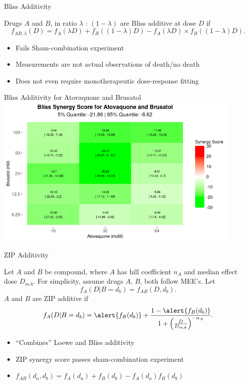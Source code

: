 \documentclass{beamer}
\begin{document}
\begin{frame}[t]{Bliss Additivity}
    \begin{definition}
        Drugs $A$ and $B$, in ratio $\lambda$ : $(1 - \lambda)$ are \alert{Bliss additive} at dose $D$ if \[
            f_{AB, \lambda}(D) = f_A(\lambda D) + f_{B}((1 - \lambda) D) - f_A(\lambda D)\times f_{B}((1 - \lambda) D).
        \]
        
    \end{definition}
    \vfill

    \begin{itemize}
        \item \alert{Fails} Sham-combination experiment 
        \item Measurements are not actual observations of death/no death
        \item Does not even require monotherapeutic dose-response fitting
    \end{itemize}
\end{frame}

\begin{frame}{Bliss Additivity for Atovaquone and Brusatol}
    \centering
    \includegraphics[width=0.9\textwidth]{figs/bliss-heatmap.png}
\end{frame}

\begin{frame}{ZIP Additivity}
    \begin{definition}
        Let $A$ and $B$ be compound, where $A$ has hill coefficient $n_A$ and median effect dose $D_{mA}$. 
        For simplicity, assume drugs $A$, $B$, both follow MEE's. 
        Let
        \[
            f_A(D | B = d_b) = f_{AB}(D, d_b).
        \]
        $A$ and $B$ are \alert{ZIP additive} if 
        \[
            f_A(D | B = d_b) = \alert{f_B(d_b)} + \frac{1 - \alert{f_B(d_b)}}{1 + \left(\frac{D}{D_{mA}}\right)^{-n_A}}.
        \]
    \end{definition}
    \begin{itemize}
        \item ``Combines'' Loewe and Bliss additivity
        \item ZIP synergy score \alert{passes} sham-combination experiment 
        \item $f_{AB}(d_a, d_b) = f_A(d_a) + f_B(d_b) - f_A(d_a)f_B(d_b)$
    \end{itemize}
\end{frame}
\end{document}
